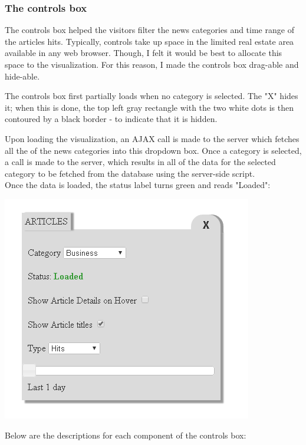 \documentclass[12pt]{article}
\begin{document}
{\subsubsection{The controls box}

The controls box helped the visitors filter the news categories and time range of the articles hits. Typically, controls take up space in the limited real estate area available in any web browser. Though, I felt it would be best to allocate this space to the visualization. For this reason, I made the controls box drag-able and hide-able.

\noindent The controls box first partially loads when no category is selected. The "X" hides it; when this is done, the top left gray rectangle with the two white dots is then contoured by a black border - to indicate that it is hidden.

Upon loading the visualization, an AJAX call is made to the server which fetches all the of the news categories into this dropdown box. Once a category is selected, a call is made to the server, which results in all of the data for the selected category to be fetched from the database using the server-side script.\\ 
\noindent Once the data is loaded, the status label turns green and reads "Loaded":

\noindent\includegraphics[scale=1]{img/viz_5}

\newpage

\noindent Below are the descriptions for each component of the controls box:

}
\end{document}
